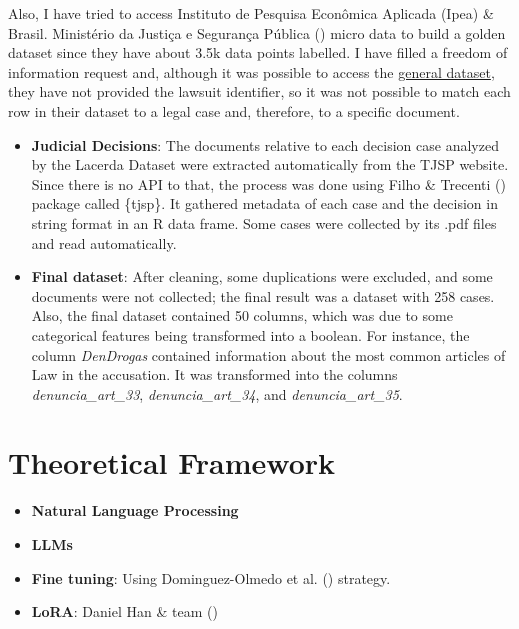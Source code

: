 \documentclass[
  12pt,
]{article}
\providecommand{\tightlist}{%
  \setlength{\itemsep}{0pt}\setlength{\parskip}{0pt}}\usepackage{longtable,booktabs,array}
\begin{document}
Also, I have tried to access Instituto de Pesquisa Econômica Aplicada
(Ipea) \& Brasil. Ministério da Justiça e Segurança Pública
()
micro data to build a golden dataset since they have about 3.5k data
points labelled. I have filled a freedom of information request and,
although it was possible to access the
\href{https://www.gov.br/mj/pt-br/assuntos/sua-protecao/politicas-sobre-drogas/pesquisa-e-informacao-3/pesquisa\%20IPEA/pesquisa-ipea-perfil-processado-e-producao-de-provas}{general
dataset}, they have not provided the lawsuit identifier, so it was not
possible to match each row in their dataset to a legal case and,
therefore, to a specific document.

\begin{itemize}
\item
  \textbf{Judicial Decisions}: The documents relative to each decision
  case analyzed by the Lacerda Dataset were extracted automatically from
  the TJSP website. Since there is no API to that, the process was done
  using Filho \& Trecenti ()
  package called \{tjsp\}. It gathered metadata of each case and the
  decision in string format in an R data frame. Some cases were
  collected by its .pdf files and read automatically.
\item
  \textbf{Final dataset}: After cleaning, some duplications were
  excluded, and some documents were not collected; the final result was
  a dataset with 258 cases. Also, the final dataset contained 50
  columns, which was due to some categorical features being transformed
  into a boolean. For instance, the column \emph{DenDrogas} contained
  information about the most common articles of Law in the accusation.
  It was transformed into the columns \emph{denuncia\_art\_33},
  \emph{denuncia\_art\_34}, and \emph{denuncia\_art\_35}.
\end{itemize}

\section{Theoretical Framework}\label{theoretical-framework}

\begin{itemize}
\tightlist
\item
  \textbf{Natural Language Processing}
\item
  \textbf{LLMs}
\item
  \textbf{Fine tuning}: Using Dominguez-Olmedo et al.
  () strategy.
\item
  \textbf{LoRA}: Daniel Han \& team
  ()
\end{itemize}
\end{document}
